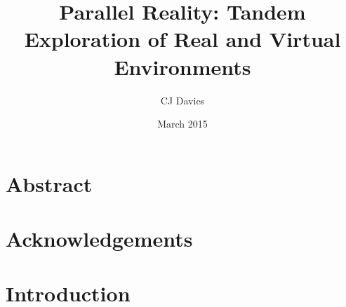 \documentclass[a4paper]{report}
\begin{document}
\title{Parallel Reality: Tandem Exploration of Real and Virtual Environments}
\date{March 2015}
\author{CJ Davies}


\pagebreak

\thispagestyle{empty}





\pagestyle{fancy}
\fancyhead[L]{\nouppercase{\leftmark}}
\fancyhead[R]{\thepage}
\fancyfoot[C]{}

\chapter*{Abstract}



\chapter*{Acknowledgements}



\tableofcontents


\listoffigures


\listoftables


\chapter{Introduction}
\graphicspath{ {06_mirrorshades_studies_results/images/} }

\end{document}
